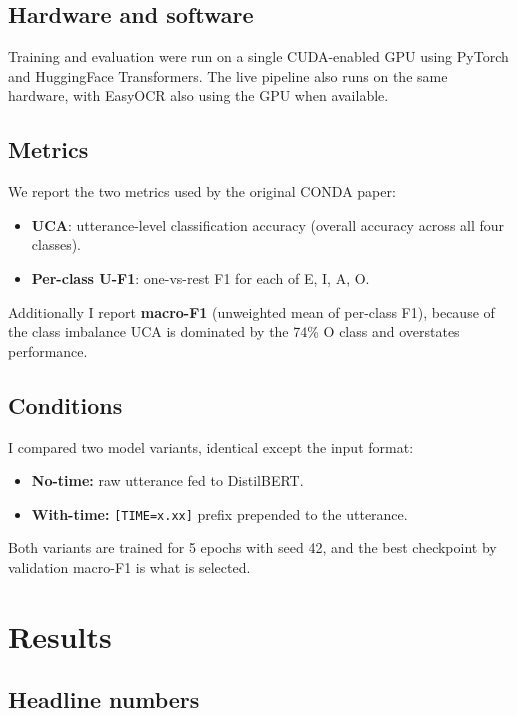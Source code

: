 \documentclass[a4paper,10.5pt,twoside]{article}
\begin{document}
\subsection{Hardware and software}

Training and evaluation were run on a single CUDA-enabled GPU using PyTorch and HuggingFace Transformers. The live pipeline also runs on the same hardware, with EasyOCR also using the GPU when available.

\subsection{Metrics}

We report the two metrics used by the original CONDA paper:
\begin{itemize}
    \item \textbf{UCA}: utterance-level classification accuracy (overall accuracy across all four classes).
    \item \textbf{Per-class U-F1}: one-vs-rest F1 for each of E, I, A, O.
\end{itemize}

Additionally I report \textbf{macro-F1} (unweighted mean of per-class F1), because of the class imbalance UCA is dominated by the 74\% O class and overstates performance.

\subsection{Conditions}

I compared two model variants, identical except the input format:
\begin{itemize}
    \item \textbf{No-time:} raw utterance fed to DistilBERT.
    \item \textbf{With-time:} \texttt{[TIME=x.xx]} prefix prepended to the utterance.
\end{itemize}

Both variants are trained for 5 epochs with seed 42, and the best checkpoint by validation macro-F1 is what is selected.

\section{Results}

\subsection{Headline numbers}
\end{document}
